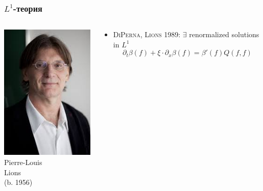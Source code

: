 \documentclass[mathserif]{beamer} %
\newcommand{\pder}[2][]{\partial_{#2}{#1}}
\newcommand{\Cite}[2][]{\alert{\textsc{#2 #1}}}
\begin{document}
\begin{frame}
    \frametitle{\(L^1\)-теория}
        \begin{columns}
    \begin{column}{0.2\textwidth}
       \includegraphics[width=1.4\textwidth]{../boltzmann_math/photos/lions}\\
       Pierre-Louis\\Lions\\(b. 1956)
    \end{column}
    \begin{column}{0.8\textwidth}
        \begin{itemize}
            \item \Cite[1989]{DiPerna, Lions}: \(\exists\) renormalized solutions in \(L^1\) \vspace{-5pt}
            \[ \pder[\beta(f)]{t} + \xi\cdot\pder[\beta(f)]{x} = \beta'(f)Q(f,f) \]

\end{itemize}
\end{column}
\end{columns}
\end{frame}
\end{document}
